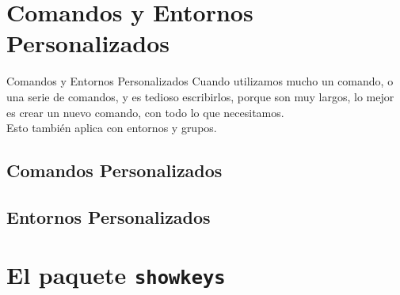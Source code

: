 \documentclass[12pt,aspectratio=43]{beamer}
\begin{document}
\section{Comandos y Entornos Personalizados}
\begin{frame}{Comandos y Entornos Personalizados}{}
Cuando utilizamos mucho un comando, o una serie de comandos, y es tedioso escribirlos, porque son muy largos, lo mejor es crear un nuevo comando, con todo lo que necesitamos.\\[1em]

Esto también aplica con entornos y grupos.
\end{frame}

\subsection{Comandos Personalizados}

\subsection{Entornos Personalizados}

\section{El paquete \texttt{showkeys}}
\end{document}
